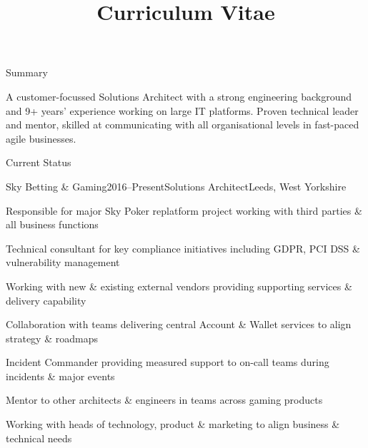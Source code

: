 \documentclass{cv}
\title{Curriculum Vitae}
\begin{document}

\begin{rSection}{Summary}

A customer-focussed Solutions Architect with a strong engineering background and 9+ years'
experience working on large IT platforms. Proven technical leader and mentor, skilled at
communicating with all organisational levels in fast-paced agile businesses.

\end{rSection}


\begin{rSection}{Current Status}

\begin{rSubsection}{Sky Betting \& Gaming}{2016--Present}{Solutions Architect}{Leeds, West Yorkshire}
\item Responsible for major Sky Poker replatform project working with third parties \& all business functions
\item Technical consultant for key compliance initiatives including GDPR, PCI DSS \& vulnerability management
\item Working with new \& existing external vendors providing supporting services \& delivery capability
\item Collaboration with teams delivering central Account \& Wallet services to align strategy \& roadmaps
\item Incident Commander providing measured support to on-call teams during incidents \& major events
\item Mentor to other architects \& engineers in teams across gaming products
\item Working with heads of technology, product \& marketing to align business \& technical needs
\end{rSubsection}

\end{rSection}

\end{document}
